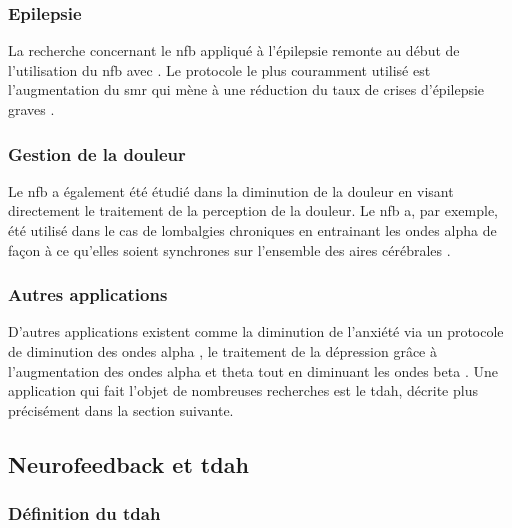 \subsubsection{Epilepsie}

La recherche concernant le \gls{nfb} appliqué à l'épilepsie remonte au début de l'utilisation du \gls{nfb} avec \citet{Lubar1976}. Le protocole le plus
couramment utilisé est l'augmentation du \gls{smr} qui mène à une réduction du taux de crises d'épilepsie graves \citep{Hughes2008, Walker2010}.

\subsubsection{Gestion de la douleur}

Le \gls{nfb} a également été étudié dans la diminution de la douleur en visant directement le traitement de la perception de la douleur. Le \gls{nfb} a, par
exemple, été utilisé dans le cas de lombalgies chroniques en entrainant les ondes alpha de façon à ce qu'elles soient synchrones sur l'ensemble des aires 
cérébrales \citep{Mayaud2019}.

\subsubsection{Autres applications}

D'autres applications existent comme la diminution de l'anxiété via un protocole de diminution des ondes alpha \citep{Budzynski2009}, le traitement de la dépression
grâce à l'augmentation des ondes alpha et theta tout en diminuant les ondes beta \citep{Hurt2014}. Une application qui fait l'objet de nombreuses recherches
est le \gls{tdah}, décrite plus précisément dans la section suivante.

\subsection{Neurofeedback et \gls{tdah}}

\subsubsection{Définition du \gls{tdah}}

